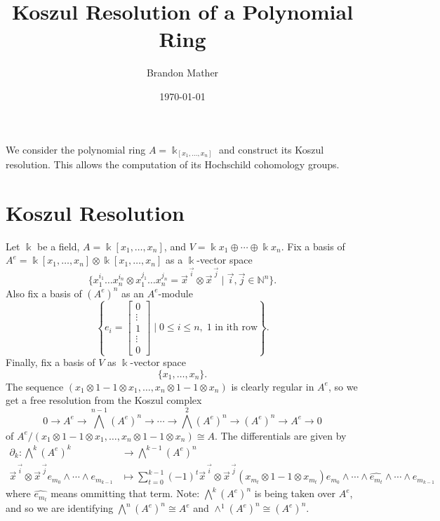 \documentclass[12pt,a4paper]{article}
\title{Koszul Resolution of a Polynomial Ring}
\author{Brandon Mather}
\date{\today}
\affil{Departments of Mathematics, University of North Texas}
\newcommand\NN{\mathbb{N}}
\newcommand{\kk}{\Bbbk}
\newcommand\1{_{(1)}}
\newcommand\2{_{(2)}}
\begin{document}
\maketitle

We consider the polynomial ring $A=\kk_[x_1,\ldots,x_n]$ and construct its Koszul resolution. 
This allows the computation of its Hochschild cohomology groups.

\maketitle

\section{Koszul Resolution}

Let $\kk$ be a field, $A=\kk[x_1,\ldots,x_n]$, and $V=\kk x_1\oplus\cdots\oplus\kk x_n$.
Fix a basis of \\$A^e=\kk[x_1,\ldots,x_n]\otimes\kk[x_1,\ldots,x_n]$ as a $\kk$-vector space
\[
\{x_1^{i_1}\ldots x_n^{i_n}\otimes x_1^{j_1}\ldots x_n^{j_n}=\vec{x}^{\,\vec{i}}\otimes\vec{x}^{\,\vec{j}}\;\vert\; \vec{i},\vec{j}\in\NN^n\}.
\]
Also fix a basis of $\left(A^e\right)^n$ as an $A^e$-module
\[
\left\{e_i=\begin{bmatrix}0\\\vdots\\1\\\vdots\\0\end{bmatrix}\;\Bigg\vert\; 0\le i\le n, \;1\text{\ in ith row}\right\}.
\]
Finally, fix a basis of $V$ as $\kk$-vector space
\[
\{x_1,\ldots,x_n\}.
\]
The sequence $(x_1\otimes 1-1\otimes x_1,\ldots,x_n\otimes1-1\otimes x_n)$ is clearly regular in $A^e$, so we get a free resolution from the Koszul complex
\[
  0\to A^e\to\bigwedge^{n-1} \left(A^e\right)^n\to\cdots\to\bigwedge^2\left(A^e\right)^n\to\left(A^e\right)^n\to A^e\to 0
\]
of $A^e/(x_1\otimes1-1\otimes x_1,\ldots,x_n\otimes1-1\otimes x_n)\cong A$.
The differentials are given by
\begin{align*}
 \partial_k:\bigwedge^k \left(A^e\right)^k&\to\bigwedge^{k-1}\left(A^e\right)^n\\
  \vec{x}^{\,\vec{i}}\otimes\vec{x}^{\,\vec{j}}e_{m_0}\wedge\cdots\wedge e_{m_{k-1}}&\mapsto\sum_{t=0}^{k-1} (-1)^t\vec{x}^{\,\vec{i}}\otimes\vec{x}^{\,\vec{j}}(x_{m_t}\otimes1-1\otimes x_{m_t})e_{m_0}\wedge\cdots\wedge\widehat{e_{m_t}}\wedge\cdots\wedge e_{m_{k-1}}
\end{align*}
where $\widehat{e_{m_t}}$ means ommitting that term.
Note: $\bigwedge^{k}\left(A^e\right)^n$ is being taken over $A^e$, and so we are identifying $\bigwedge^n\left(A^e\right)^n\cong A^e$ and $\wedge^1\left(A^e\right)^n\cong \left(A^e\right)^n$.
\end{document}
